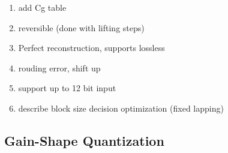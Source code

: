 \documentclass[conference, 10pt]{IEEEtran}
\begin{document}
\begin{enumerate}
\item add Cg table
\item reversible (done with lifting steps)
\item Perfect reconstruction, supports lossless
\item rouding error, shift up
\item support up to 12 bit input
\item describe block size decision optimization (fixed lapping)
\end{enumerate}


%
%
%
%
%
%

\subsection{Gain-Shape Quantization}
\label{sec:pvq}
\end{document}
